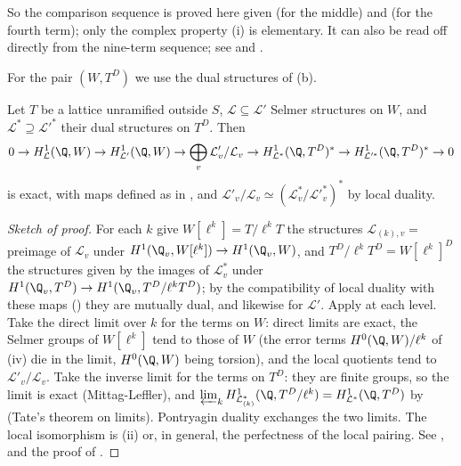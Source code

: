 \noindent So the comparison sequence is proved here given  (for the middle) and  (for the fourth term); only the
complex property (i) is elementary. It can also be read off directly from the nine-term sequence; see \cite[Section 1.7]{Rubin} and \cite[Section 2.3]{MazurRubin04}.

For the pair $(W,T^D)$ we use the dual structures of (b).

\begin{theorem}\label{thm:galcoh:comparison-l-adic}
Let $T$ be a lattice unramified outside $S$, $\mathcal L\subseteq\mathcal L'$ Selmer structures on $W$, and $\mathcal L^*\supseteq\mathcal L'^*$ their dual structures on $T^D$. Then
\[
0\to H^1_{\mathcal L}(\Q,W)\to H^1_{\mathcal L'}(\Q,W)\to\bigoplus_v\mathcal L'_v/\mathcal L_v\to H^1_{\mathcal L^*}(\Q,T^D)^*\to H^1_{\mathcal L'^*}(\Q,T^D)^*\to0
\]
is exact, with maps defined as in , and $\mathcal L'_v/\mathcal L_v\simeq(\mathcal L^*_v/\mathcal L'^*_v)^*$ by local duality.
\end{theorem}

\begin{proof}[Sketch of proof]
For each $k$ give $W[\ell^k]=T/\ell^kT$ the structures $\mathcal L_{(k),v}=$ preimage of $\mathcal L_v$ under $H^1(\Q_v,W[\ell^k])\to H^1(\Q_v,W)$, and $T^D/\ell^kT^D=W[\ell^k]^D$ the
structures given by the images of $\mathcal L^*_v$ under $H^1(\Q_v,T^D)\to H^1(\Q_v,T^D/\ell^kT^D)$; by the compatibility of local duality with these maps
() they are mutually dual, and likewise for $\mathcal L'$. Apply  at each level. Take the direct limit over $k$ for the terms on
$W$: direct limits are exact, the Selmer groups of $W[\ell^k]$ tend to those of $W$ (the error terms $H^0(\Q,W)/\ell^k$ of (iv) die in the limit, $H^0(\Q,W)$
being torsion), and the local quotients tend to $\mathcal L'_v/\mathcal L_v$. Take the inverse limit for the terms on $T^D$: they are finite groups, so the limit is exact (Mittag-Leffler),
and $\varprojlim_kH^1_{\mathcal L^*_{(k)}}(\Q,T^D/\ell^k)=H^1_{\mathcal L^*}(\Q,T^D)$ by  (Tate's theorem on limits). Pontryagin duality exchanges the two limits. The
local isomorphism is (ii) or, in general, the perfectness of the local pairing. See \cite[Section 1.7 and Appendix B]{Rubin},
\cite[Section 4]{Greenberg89} and the proof of \cite[Lemma 2.1]{DFG04}.
\end{proof}

